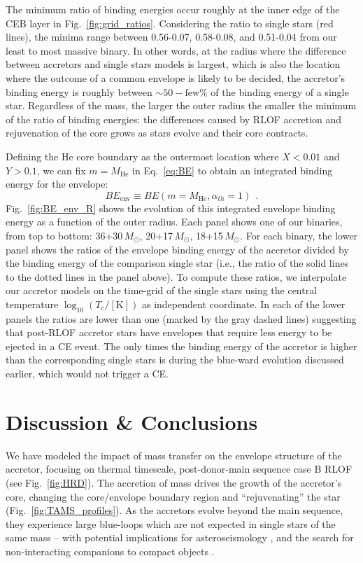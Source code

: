 \documentclass[twocolumn,twocolappendix,trackchanges]{aastex63}
\DeclareRobustCommand{\Eqref}[1]{Eq.~\ref{#1}}
\DeclareRobustCommand{\Figref}[1]{Fig.~\ref{#1}}
\begin{document}
The minimum ratio of binding energies occur roughly at the inner edge
of the CEB layer in \Figref{fig:grid_ratios}. Considering the
ratio to single stars (red lines), the minima range between 0.56-0.07,
0.58-0.08, and 0.51-0.04 from our least to most massive binary. In
other words, at the radius where the difference between accretors and
single stars models is largest, which is also the location where the
outcome of a common envelope is likely to be decided, the accretor's
binding energy is roughly between $\sim{}50-\mathrm{few}\%$ of the
binding energy of a single star. Regardless of the mass, the larger
the outer radius the smaller the minimum of the ratio of binding
energies: the differences caused by RLOF accretion and rejuvenation of
the core grows as stars evolve and their core contracts.


Defining the He core boundary as the outermost location where $X<0.01$
and $Y>0.1$, we can fix $m=M_\mathrm{He}$ in \Eqref{eq:BE} to obtain
an integrated binding energy for the envelope:
\begin{equation}
  \label{eq:BE_env}
  BE_\mathrm{env} \equiv BE(m=M_\mathrm{He}, \alpha_{th}=1) \ \ .
\end{equation}
\Figref{fig:BE_env_R} shows the evolution of this integrated envelope
binding energy as a function of the outer radius. Each panel shows one
of our binaries, from top to bottom: 36+30\,$M_\odot$,
20+17\,$M_\odot$, 18+15\,$M_\odot$. For each binary, the lower panel
shows the ratios of the envelope binding energy of the accretor
divided by the binding energy of the comparison single star (i.e., the
ratio of the solid lines to the dotted lines in the
panel above). To compute these ratios, we interpolate our accretor
models on the time-grid of the single stars using the central
temperature $\log_{10}(T_c/[\mathrm{K}])$ as independent coordinate.
In each of the lower panels the ratios are lower than one (marked by
the gray dashed lines) suggesting that post-RLOF accretor stars have
envelopes that require less energy to be ejected in a CE event. The
only times the binding energy of the accretor is higher than the
corresponding single stars is during the blue-ward evolution discussed
earlier, which would not trigger a CE.

\section{Discussion \& Conclusions}
\label{sec:conclusions}

We have modeled the impact of mass transfer on the envelope structure
of the accretor, focusing on thermal timescale, post-donor-main
sequence case B RLOF (see \Figref{fig:HRD}). The accretion of mass
drives the growth of the accretor's core, changing the core/envelope
boundary region and ``rejuvenating'' the star (\Figref{fig:TAMS_profiles}). As the accretors evolve
beyond the main sequence, they experience large blue-loops which are
not expected in single stars of the same mass -- with potential
implications for asteroseismology \citep[e.g.,][]{dorn-wallenstein:20},
and the search for non-interacting companions to compact objects
\citep[e.g.,][]{breivik:17, andrews:19, chawla:21}.
\end{document}
